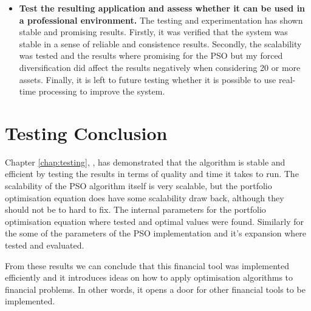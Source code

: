 \begin{itemize}
    \item \textbf{Test the resulting application and assess whether it can be used in a professional environment.} The testing and experimentation has shown stable and promising results. Firstly, it was verified that the system was stable in a sense of reliable and consistence results. Secondly, the scalability was tested and the results where promising for the PSO but my forced diversification did affect the results negatively when considering 20 or more assets. Finally, it is left to future testing whether it is possible to use real-time processing to improve the system.
  \end{itemize}

  \section{Testing Conclusion} %
  \label{sec:testing_conclusion}
    Chapter \ref{chap:testing}, , has demonstrated that the algorithm is stable and efficient by testing the results in terms of quality and time it takes to run. The scalability of the PSO algorithm itself is very scalable, but the portfolio optimisation equation does have some scalability draw back, although they should not be to hard to fix. The internal parameters for the portfolio optimisation equation where tested and optimal values were found. Similarly for the some of the parameters of the PSO implementation and it's expansion where tested and evaluated. 

    From these results we can conclude that this financial tool was implemented efficiently and it introduces ideas on how to apply optimisation algorithms to financial problems. In other words, it opens a door for other financial tools to be implemented. 


